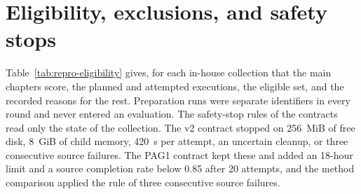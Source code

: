 \section{Eligibility, exclusions, and safety stops}
\label{sec:repro-eligibility}

Table~\ref{tab:repro-eligibility} gives, for each in-house collection
that the main chapters score, the planned and attempted executions, the
eligible set, and the recorded reasons for the rest. Preparation runs
were separate identifiers in every round and never entered an
evaluation. The safety-stop rules of the contracts read only the state
of the collection. The v2 contract stopped on 256~MiB of free disk,
8~GiB of child memory, 420~s per attempt, an uncertain cleanup, or three
consecutive source failures. The PAG1 contract kept these and added an
18-hour limit and a source completion rate below 0.85 after 20
attempts, and the method comparison applied the rule of three
consecutive source failures.


